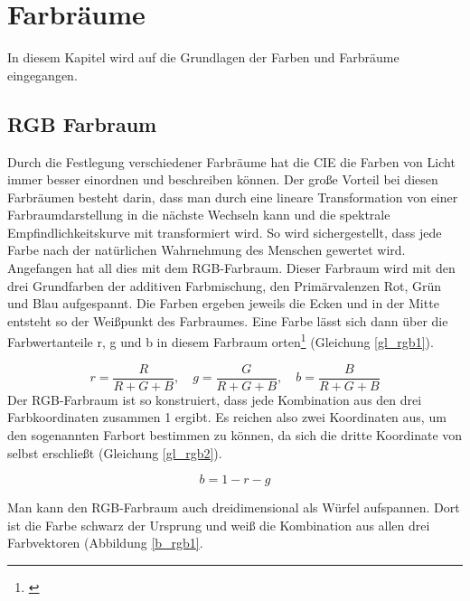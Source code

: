 \chapter{Farbräume} 
In diesem Kapitel wird auf die Grundlagen der Farben und Farbräume eingegangen.
 
\section{RGB Farbraum} \label{sec_rgb}
Durch die Festlegung verschiedener Farbräume hat die CIE die Farben von Licht immer besser einordnen und beschreiben können. Der große Vorteil bei diesen Farbräumen besteht darin, dass man durch eine lineare Transformation von einer Farbraumdarstellung in die nächste Wechseln kann und die spektrale Empfindlichkeitskurve mit transformiert wird. So wird sichergestellt, dass jede Farbe nach der natürlichen Wahrnehmung des Menschen gewertet wird.
Angefangen hat all dies mit dem RGB-Farbraum. Dieser Farbraum wird mit den drei Grundfarben der additiven Farbmischung, den Primärvalenzen Rot, Grün und Blau aufgespannt. Die Farben ergeben jeweils die Ecken und in der Mitte entsteht so der Weißpunkt des Farbraumes. Eine Farbe lässt sich dann über die Farbwertanteile r, g und b in diesem Farbraum orten\footnote{\cite[106]{hentschel}} (Gleichung \ref{gl_rgb1}).

\begin{equation}\label{gl_rgb1}
		r = \frac{R}{R+G+B},\quad g = \frac{G}{R+G+B},\quad b = \frac{B}{R+G+B}
\end{equation}
Der RGB-Farbraum ist so konstruiert, dass jede Kombination aus den drei Farbkoordinaten zusammen 1 ergibt. Es reichen also zwei Koordinaten aus, um den sogenannten Farbort bestimmen zu können, da sich die dritte Koordinate von selbst erschließt (Gleichung \ref{gl_rgb2}). 

\begin{equation}\label{gl_rgb2}
		b=1-r-g
\end{equation}

Man kann den RGB-Farbraum auch dreidimensional als Würfel aufspannen. Dort ist die Farbe schwarz der Ursprung und weiß die Kombination aus allen drei Farbvektoren (Abbildung \ref{b_rgb1}.

